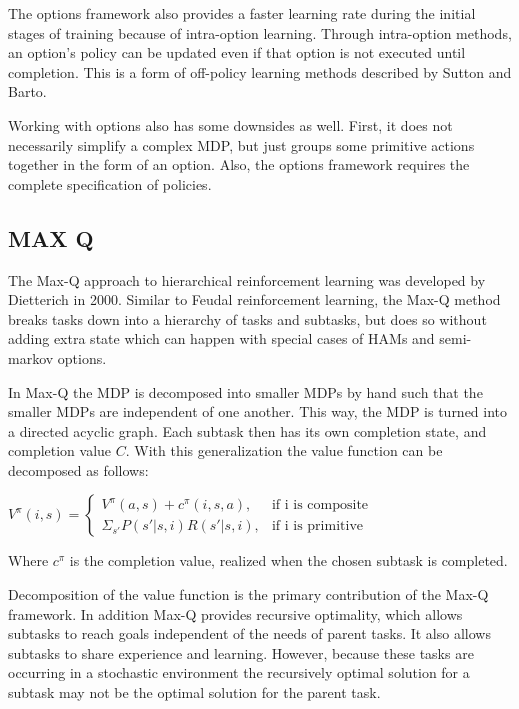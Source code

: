 \par The options framework also provides a faster learning rate during the initial stages of training because of intra-option learning. Through intra-option methods, an option's policy can be updated even if that option is not executed until completion. This is a form of off-policy learning methods described by Sutton and Barto.

\par Working with options also has some downsides as well. First, it does not necessarily simplify a complex MDP, but just groups some primitive actions together in the form of an option. Also, the options framework requires the complete specification of policies.

\subsection{MAX Q}

\par The Max-Q approach to hierarchical reinforcement learning was developed by Dietterich in 2000. Similar to Feudal reinforcement learning, the Max-Q method breaks tasks down into a hierarchy of tasks and subtasks, but does so without adding extra state which can happen with special cases of HAMs and semi-markov options.

\par In Max-Q the MDP is decomposed into smaller MDPs by hand such that the smaller MDPs are independent of one another. This way, the MDP is turned into a directed acyclic graph. Each subtask then has its own completion state, and completion value $C$. With this generalization the value function can be decomposed as follows:

\begin{math}
V^{\pi}(i, s) =                                                                    
\begin{cases}                                                                      
V^{\pi}(a, s) + c^{\pi}(i, s, a), & \text{if i is composite}\\                     
\Sigma_{s'}P(s'|s, i)R(s'|s, i), & \text{if i is primitive}                        
\end{cases}
\end{math}

\par Where $c^{\pi}$ is the completion value, realized when the chosen subtask is completed.

\par Decomposition of the value function is the primary contribution of the Max-Q framework. In addition Max-Q provides recursive optimality, which allows subtasks to reach goals independent of the needs of parent tasks. It also allows subtasks to share experience and learning. However, because these tasks are occurring in a stochastic environment the recursively optimal solution for a subtask may not be the optimal solution for the parent task.